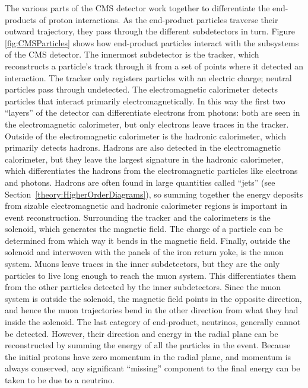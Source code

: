 The various parts of the CMS detector work together to differentiate
the end-products of proton interactions.  
As the end-product particles traverse their outward trajectory,
they pass through the different subdetectors in turn.
Figure \ref{fig:CMSParticles} shows how end-product particles 
interact with the subsystems of the CMS detector.  
The innermost subdetector is the tracker, 
which reconstructs a particle's track through it
from a set of points where it detected an interaction.  
The tracker only registers particles with an electric charge;%
neutral particles pass through undetected.  
The electromagnetic calorimeter detects particles that interact
primarily electromagnetically.%
In this way the first two ``layers'' of the detector can differentiate
electrons from photons: 
both are seen in the electromagnetic calorimeter, 
but only electrons leave traces in the tracker.
Outside of the electromagnetic calorimeter is the hadronic calorimeter,
which primarily detects hadrons.  
Hadrons are also detected in the electromagnetic calorimeter,
but they leave the largest signature in the hadronic calorimeter,
which differentiates the hadrons from the electromagnetic particles
like electrons and photons.  
Hadrons are often found in large quantities called ``jets'' 
(see Section~\ref{theory:HigherOrderDiagrams}),
so summing together the energy deposits from sizable electromagnetic 
and hadronic calorimeter regions is important in event reconstruction.  
Surrounding the tracker and the calorimeters is the solenoid,
which generates the magnetic field.
The charge of a particle can be determined from which way it
bends in the magnetic field.
Finally, outside the solenoid and interwoven with the panels of the 
iron return yoke, is the muon system.  
Muons leave traces in the inner subdetectors, 
but they are the only particles to live long enough to reach the
muon system.
This differentiates them from the other particles detected by 
the inner subdetectors.  
Since the muon system is outside the solenoid, 
the magnetic field points in the opposite direction,
and hence the muon trajectories bend in the other direction
from what they had inside the solenoid.  
The last category of end-product, neutrinos, 
generally cannot be detected.
However, their direction and energy in the radial plane 
can be reconstructed 
by summing the energy of all the particles in the event.
Because the initial protons have zero momentum in the radial plane, 
and momentum is always conserved, 
any significant ``missing'' component to the final energy
can be taken to be due to a neutrino.  

